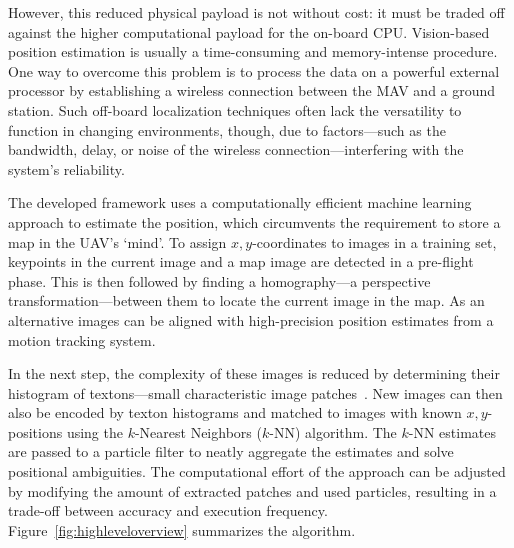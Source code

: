 \documentclass[11pt]{report}
\begin{document}
However, this reduced physical payload is not without cost: it must be
traded off against the higher computational payload for the on-board
CPU. Vision-based position estimation is usually a time-consuming and
memory-intense procedure. One way to overcome this problem is to
process the data on a powerful external processor by establishing a
wireless connection between the MAV and a ground station. Such
off-board localization techniques often lack the versatility to
function in changing environments, though, due to factors---such as
the bandwidth, delay, or noise of the wireless
connection---interfering with the system's reliability.

The developed framework uses a computationally efficient machine
learning approach to estimate the position, which circumvents the
requirement to store a map in the UAV's `mind'. To assign
$x,y$-coordinates to images in a training set, keypoints in the
current image and a map image are detected in a pre-flight phase. This
is then followed by finding a homography---a perspective
transformation---between them to locate the current image in the
map. As an alternative images can be aligned with high-precision
position estimates from a motion tracking system.


In the next step, the complexity of these images is reduced by
determining their histogram of textons---small characteristic image
patches~\cite{varma2005statistical}. New images can then also be
encoded by texton histograms and matched to images with known
$x,y$-positions using the $k$-Nearest Neighbors ($k$-NN)
algorithm. The $k$-NN estimates are passed to a particle filter to
neatly aggregate the estimates and solve positional ambiguities. The
computational effort of the approach can be adjusted by modifying the
amount of extracted patches and used particles, resulting in a
trade-off between accuracy and execution
frequency. Figure~\ref{fig:highleveloverview} summarizes the
algorithm.
\end{document}
